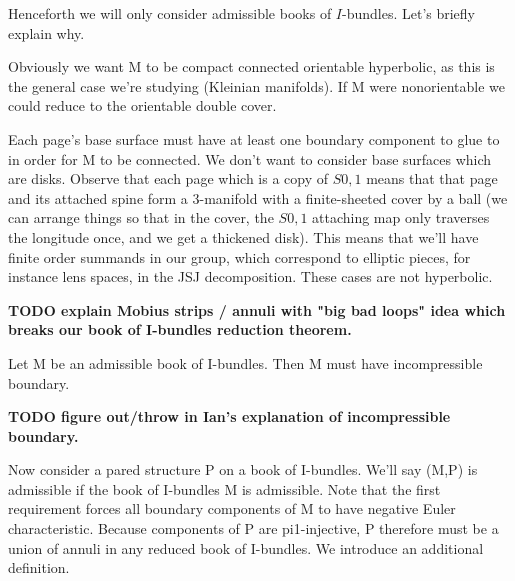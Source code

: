 Henceforth we will only consider admissible books of $I$-bundles. Let's briefly
explain why.

Obviously we want M to be compact connected orientable hyperbolic, as this is
the general case we're studying (Kleinian manifolds). If M were nonorientable
we could reduce to the orientable double cover.

Each page's base surface must have at least one boundary component to glue to
in order for M to be connected. We don't want to consider base surfaces which
are disks.  Observe that each page which is a copy of $S0,1$ means that that
page and its attached spine form a 3-manifold with a finite-sheeted cover by
a ball (we can arrange things so that in the cover, the $S0,1$ attaching map
only traverses the longitude once, and we get a thickened disk).  This means
that we'll have finite order summands in our group, which correspond to
elliptic pieces, for instance lens spaces, in the JSJ decomposition. These
cases are not hyperbolic.

\textbf{TODO explain Mobius strips / annuli with "big bad loops" idea which
breaks our book of I-bundles reduction theorem.}

\begin{prop}

Let M be an admissible book of I-bundles. Then M must have incompressible
boundary.

\end{prop}

\textbf{TODO figure out/throw in Ian's explanation of incompressible boundary.}

Now consider a pared structure P on a book of I-bundles. We'll say (M,P) is
admissible if the book of I-bundles M is admissible. Note that the first
requirement forces all boundary components of M to have negative Euler
characteristic. Because components of P are pi1-injective, P therefore must be
a union of annuli in any reduced book of I-bundles. We introduce an additional
definition.

